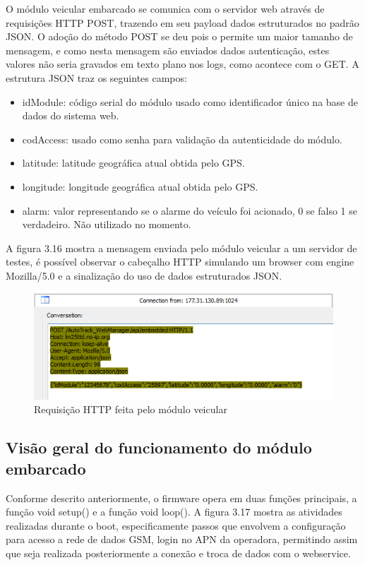 O módulo veicular embarcado se comunica com o servidor web através de requisições HTTP POST, trazendo em seu
payload dados estruturados no padrão JSON. O adoção do método POST se deu pois o permite um maior tamanho de
mensagem, e como nesta mensagem são enviados dados autenticação, estes valores não seria gravados em texto
plano nos logs, como acontece com o GET. A estrutura JSON traz os seguintes campos:

\begin{itemize}
	\item idModule: código serial do módulo usado como identificador único na base de dados do sistema web.
	\item codAccess: usado como senha para validação da autenticidade do módulo.
	\item latitude: latitude geográfica atual obtida pelo GPS.
	\item longitude: longitude geográfica atual obtida pelo GPS.
	\item alarm: valor representando se o alarme do veículo foi acionado, 0 se falso 1 se verdadeiro. Não utilizado no momento.
\end{itemize}

A figura 3.16 mostra a mensagem enviada pelo módulo veicular a um servidor de testes, é possível observar o cabeçalho HTTP simulando um browser com engine Mozilla/5.0 e a sinalização do uso de dados estruturados JSON.

\begin{figure}[!htb]
	\centering
	\includegraphics[width=\textwidth]{figures/requisicao_post.png}
	\caption{Requisição HTTP feita pelo módulo veicular}
	\label{1}
\end{figure}

\subsection {Visão geral do funcionamento do módulo embarcado}

Conforme descrito anteriormente, o firmware opera em duas funções principais, a função void setup() e a função void loop(). A figura 3.17 mostra as atividades realizadas durante o boot, especificamente passos que envolvem a configuração para acesso a rede de dados GSM, login no APN da operadora, permitindo assim que seja realizada posteriormente a conexão e troca de dados com o webservice.


